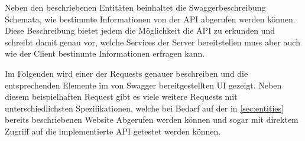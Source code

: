 	Neben den beschriebenen Entitäten beinhaltet die Swaggerbeschreibung Schemata, wie bestimmte Informationen von der API abgerufen werden können. Diese Beschreibung bietet jedem die Möglichkeit die API zu erkunden und schreibt damit genau vor, welche Services der Server bereitstellen muss aber auch wie der Client bestimmte Informationen erfragen kann.
	
	\vspace{0.25cm}
	
	Im Folgenden wird einer der Requests genauer beschreiben und die entsprechenden Elemente im von Swagger bereitgestellten UI gezeigt. Neben diesem beispielhaften Request gibt es viele weitere Requests mit unterschiedlichsten Spezifikationen, welche bei Bedarf auf der in \autoref{sec:entities} bereits beschriebenen Website Abgerufen werden können und sogar mit direktem Zugriff auf die implementierte API getestet werden können.
